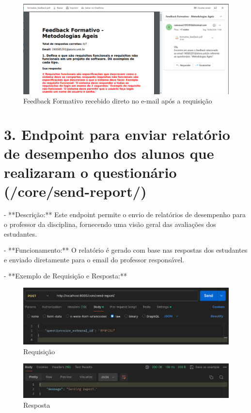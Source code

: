 \begin{figure}[H]
    \centering
    \includegraphics[width=1\textwidth]{figuras/feedback.png}
    \caption{Feedback Formativo recebido direto no e-mail após a requisição}
    \label{fig:report_questions}
\end{figure}

\section*{3. Endpoint para enviar relatório de desempenho dos alunos que realizaram o questionário (/core/send-report/)}

- **Descrição:** Este endpoint permite o envio de relatórios de desempenho para o professor da disciplina, fornecendo uma visão geral das avaliações dos estudantes.

- **Funcionamento:** O relatório é gerado com base nas respostas dos estudantes e enviado diretamente para o email do professor responsável.

- **Exemplo de Requisição e Resposta:**
  
\begin{figure}[H]
    \centering
    \includegraphics[width=1\textwidth]{figuras/send_report_teacher.png}
    \caption{Requisição}
    \label{fig:report_questions}
\end{figure}

\begin{figure}[H]
    \centering
    \includegraphics[width=1\textwidth]{figuras/send_report_teacher_result.png}
    \caption{Resposta}
    \label{fig:report_questions}
\end{figure}


